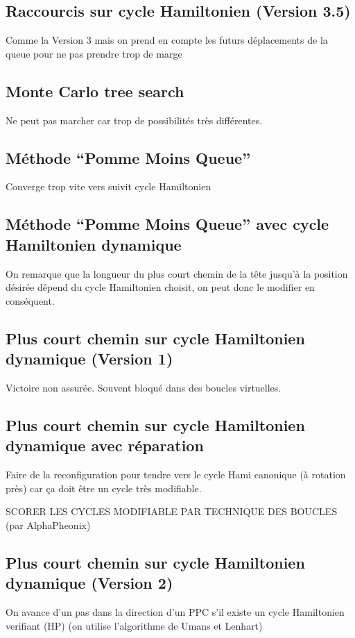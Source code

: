 \documentclass[french,a4paper]{article}
\begin{document}
\subsection{Raccourcis sur cycle Hamiltonien (Version 3.5)}
Comme la Version 3 mais on prend en compte les futurs déplacements de la queue pour ne pas prendre trop de marge


\subsection{Monte Carlo tree search}
Ne peut pas marcher car trop de possibilités très différentes.

\subsection{Méthode ``Pomme Moins Queue''}
Converge trop vite vers suivit cycle Hamiltonien

\subsection{Méthode ``Pomme Moins Queue'' avec cycle Hamiltonien dynamique}
On remarque que la longueur du plus court chemin de la tête jusqu'à la position désirée dépend du cycle Hamiltonien choisit, on peut donc le modifier en conséquent.

\subsection{Plus court chemin sur cycle Hamiltonien dynamique (Version 1)}
Victoire non assurée. Souvent bloqué dans des boucles virtuelles.

\subsection{Plus court chemin sur cycle Hamiltonien dynamique avec réparation}
Faire de la reconfiguration pour tendre vers le cycle Hami canonique (à rotation près) car ça doit être un cycle très modifiable.

SCORER LES CYCLES MODIFIABLE PAR TECHNIQUE DES BOUCLES (par AlphaPheonix)

\subsection{Plus court chemin sur cycle Hamiltonien dynamique (Version 2)}
On avance d'un pas dans la direction d'un PPC s'il existe un cycle Hamiltonien verifiant (HP) (on utilise l'algorithme de Umans et Lenhart)
\end{document}
